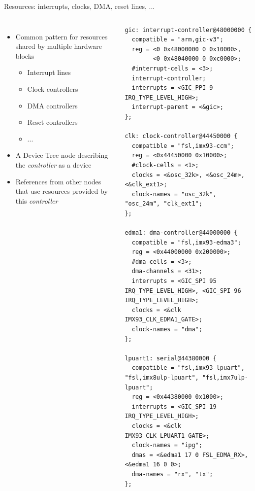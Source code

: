 \begin{frame}[fragile]{Resources: interrupts, clocks, DMA, reset lines, ...}
  \begin{columns}
  \begin{itemize}
  \item Common pattern for resources shared by multiple hardware
    blocks
    \begin{itemize}
    \item Interrupt lines
    \item Clock controllers
    \item DMA controllers
    \item Reset controllers
    \item ...
    \end{itemize}
  \item A Device Tree node describing the {\em controller} as a device
  \item References from other nodes that use resources provided by
    this {\em controller}
  \end{itemize}
\begin{block}{}
{\fontsize{4}{5}\selectfont
\begin{verbatim}
gic: interrupt-controller@48000000 {
  compatible = "arm,gic-v3";
  reg = <0 0x48000000 0 0x10000>,
        <0 0x48040000 0 0xc0000>;
  #interrupt-cells = <3>;
  interrupt-controller;
  interrupts = <GIC_PPI 9 IRQ_TYPE_LEVEL_HIGH>;
  interrupt-parent = <&gic>;
};

clk: clock-controller@44450000 {
  compatible = "fsl,imx93-ccm";
  reg = <0x44450000 0x10000>;
  #clock-cells = <1>;
  clocks = <&osc_32k>, <&osc_24m>, <&clk_ext1>;
  clock-names = "osc_32k", "osc_24m", "clk_ext1";
};

edma1: dma-controller@44000000 {
  compatible = "fsl,imx93-edma3";
  reg = <0x44000000 0x200000>;
  #dma-cells = <3>;
  dma-channels = <31>;
  interrupts = <GIC_SPI 95 IRQ_TYPE_LEVEL_HIGH>, <GIC_SPI 96 IRQ_TYPE_LEVEL_HIGH>;
  clocks = <&clk IMX93_CLK_EDMA1_GATE>;
  clock-names = "dma";
};

lpuart1: serial@44380000 {
  compatible = "fsl,imx93-lpuart", "fsl,imx8ulp-lpuart", "fsl,imx7ulp-lpuart";
  reg = <0x44380000 0x1000>;
  interrupts = <GIC_SPI 19 IRQ_TYPE_LEVEL_HIGH>;
  clocks = <&clk IMX93_CLK_LPUART1_GATE>;
  clock-names = "ipg";
  dmas = <&edma1 17 0 FSL_EDMA_RX>, <&edma1 16 0 0>;
  dma-names = "rx", "tx";
};
\end{verbatim}
}
\end{block}
\end{columns}
\end{frame}

